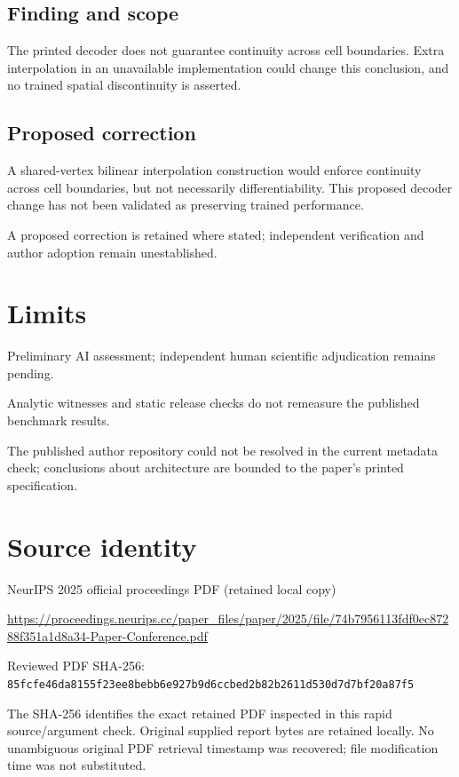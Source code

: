 \documentclass[11pt]{article}
\begin{document}
\subsection*{Finding and scope}

The printed decoder does not guarantee continuity across cell boundaries. Extra interpolation in an unavailable implementation could change this conclusion, and no trained spatial discontinuity is asserted.

\subsection*{Proposed correction}

A shared-vertex bilinear interpolation construction would enforce continuity across cell boundaries, but not necessarily differentiability. This proposed decoder change has not been validated as preserving trained performance.

A proposed correction is retained where stated; independent verification and author adoption remain unestablished.

\section*{Limits}

Preliminary AI assessment; independent human scientific adjudication remains pending.\par

Analytic witnesses and static release checks do not remeasure the published benchmark results.\par

The published author repository could not be resolved in the current metadata check; conclusions about architecture are bounded to the paper’s printed specification.\par

\section*{Source identity}

NeurIPS 2025 official proceedings PDF (retained local copy)

\url{https://proceedings.neurips.cc/paper_files/paper/2025/file/74b7956113fdf0ec87288f351a1d8a34-Paper-Conference.pdf}

Reviewed PDF SHA-256: \nolinkurl{85fcfe46da8155f23ee8bebb6e927b9d6ccbed2b82b2611d530d7d7bf20a87f5}

The SHA-256 identifies the exact retained PDF inspected in this rapid source/argument check. Original supplied report bytes are retained locally. No unambiguous original PDF retrieval timestamp was recovered; file modification time was not substituted.
\end{document}
